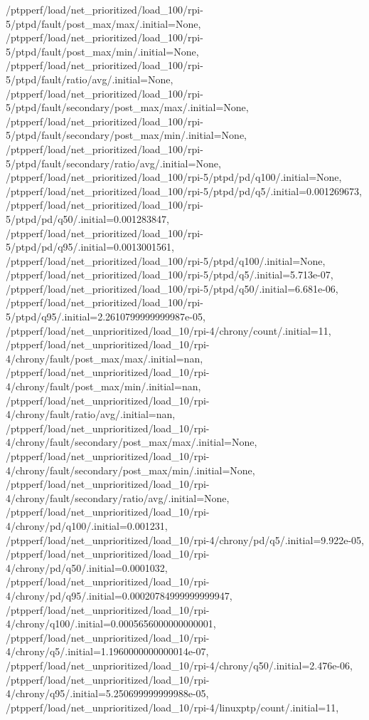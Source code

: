 {    /ptpperf/load/net_prioritized/load_100/rpi-5/ptpd/fault/post_max/max/.initial=None,
    /ptpperf/load/net_prioritized/load_100/rpi-5/ptpd/fault/post_max/min/.initial=None,
    /ptpperf/load/net_prioritized/load_100/rpi-5/ptpd/fault/ratio/avg/.initial=None,
    /ptpperf/load/net_prioritized/load_100/rpi-5/ptpd/fault/secondary/post_max/max/.initial=None,
    /ptpperf/load/net_prioritized/load_100/rpi-5/ptpd/fault/secondary/post_max/min/.initial=None,
    /ptpperf/load/net_prioritized/load_100/rpi-5/ptpd/fault/secondary/ratio/avg/.initial=None,
    /ptpperf/load/net_prioritized/load_100/rpi-5/ptpd/pd/q100/.initial=None,
    /ptpperf/load/net_prioritized/load_100/rpi-5/ptpd/pd/q5/.initial=0.001269673,
    /ptpperf/load/net_prioritized/load_100/rpi-5/ptpd/pd/q50/.initial=0.001283847,
    /ptpperf/load/net_prioritized/load_100/rpi-5/ptpd/pd/q95/.initial=0.0013001561,
    /ptpperf/load/net_prioritized/load_100/rpi-5/ptpd/q100/.initial=None,
    /ptpperf/load/net_prioritized/load_100/rpi-5/ptpd/q5/.initial=5.713e-07,
    /ptpperf/load/net_prioritized/load_100/rpi-5/ptpd/q50/.initial=6.681e-06,
    /ptpperf/load/net_prioritized/load_100/rpi-5/ptpd/q95/.initial=2.2610799999999987e-05,
    /ptpperf/load/net_unprioritized/load_10/rpi-4/chrony/count/.initial=11,
    /ptpperf/load/net_unprioritized/load_10/rpi-4/chrony/fault/post_max/max/.initial=nan,
    /ptpperf/load/net_unprioritized/load_10/rpi-4/chrony/fault/post_max/min/.initial=nan,
    /ptpperf/load/net_unprioritized/load_10/rpi-4/chrony/fault/ratio/avg/.initial=nan,
    /ptpperf/load/net_unprioritized/load_10/rpi-4/chrony/fault/secondary/post_max/max/.initial=None,
    /ptpperf/load/net_unprioritized/load_10/rpi-4/chrony/fault/secondary/post_max/min/.initial=None,
    /ptpperf/load/net_unprioritized/load_10/rpi-4/chrony/fault/secondary/ratio/avg/.initial=None,
    /ptpperf/load/net_unprioritized/load_10/rpi-4/chrony/pd/q100/.initial=0.001231,
    /ptpperf/load/net_unprioritized/load_10/rpi-4/chrony/pd/q5/.initial=9.922e-05,
    /ptpperf/load/net_unprioritized/load_10/rpi-4/chrony/pd/q50/.initial=0.0001032,
    /ptpperf/load/net_unprioritized/load_10/rpi-4/chrony/pd/q95/.initial=0.00020784999999999947,
    /ptpperf/load/net_unprioritized/load_10/rpi-4/chrony/q100/.initial=0.0005656000000000001,
    /ptpperf/load/net_unprioritized/load_10/rpi-4/chrony/q5/.initial=1.1960000000000014e-07,
    /ptpperf/load/net_unprioritized/load_10/rpi-4/chrony/q50/.initial=2.476e-06,
    /ptpperf/load/net_unprioritized/load_10/rpi-4/chrony/q95/.initial=5.250699999999988e-05,
    /ptpperf/load/net_unprioritized/load_10/rpi-4/linuxptp/count/.initial=11,
}
